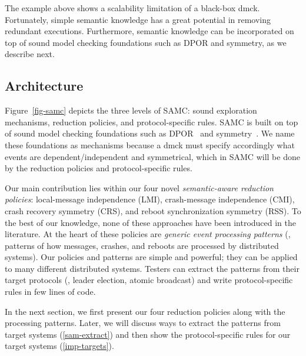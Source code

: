 The example above shows a scalability limitation of a black-box dmck.
Fortunately, simple semantic knowledge has a great potential in removing
redundant executions.  Furthermore, semantic knowledge can be incorporated on
top of sound model checking foundations such as DPOR and symmetry, as we
describe next.

\subsection{Architecture}
\label{sam-arch}

Figure~\ref{fig-samc} depicts the three levels of SAMC: sound
exploration mechanisms, reduction policies, and protocol-specific
rules.  SAMC is built on top of sound model checking foundations such
as DPOR~\cite{Flanagan+05-Dpor, Godefroid+96-Dpor} and
symmetry~\cite{Clarke+98-SymReduct, Prasad+00-SymBasedMc}.  We name
these foundations as mechanisms because a dmck must specify
accordingly what events are dependent/independent and symmetrical,
which in SAMC will be done by the reduction policies and
protocol-specific rules.


Our main contribution lies within our four novel {\em semantic-aware
  reduction policies}: local-message independence (LMI), crash-message
independence (CMI), crash recovery symmetry (CRS), and reboot
synchronization symmetry (RSS).  To the best of our knowledge, none of
these approaches have been introduced in the literature.  At the heart
of these policies are {\em generic event processing patterns} (\ie,
patterns of how messages, crashes, and reboots are processed by
distributed systems).  Our policies and patterns are simple and
powerful; they can be applied to many different distributed systems.  Testers
can extract the patterns from their target protocols (\eg,
leader election, atomic broadcast) and write protocol-specific
rules in few lines of code.

In the next section, we first present our four reduction policies
along with the processing patterns.  Later, we will discuss ways to
extract the patterns from target systems (\sec\ref{sam-extract}) and
then show the protocol-specific rules for our target systems
(\sec\ref{imp-targets}).


